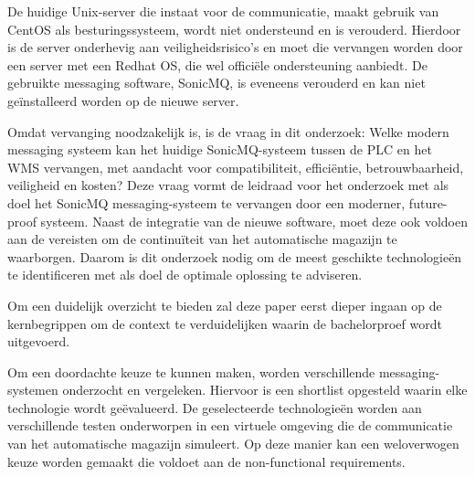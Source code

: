 De huidige Unix-server die instaat voor de communicatie, maakt gebruik van \mbox{CentOS} als besturingssysteem,
wordt niet ondersteund en is verouderd.
Hierdoor is de server onderhevig aan veiligheidsrisico's en moet die vervangen worden door een server met een Redhat OS, 
die wel officiële ondersteuning aanbiedt.
De gebruikte messaging software, SonicMQ, is eveneens verouderd en kan niet geïnstalleerd worden op de nieuwe server. 
\newline

Omdat vervanging noodzakelijk is, is de vraag in dit onderzoek: 
Welke modern messaging systeem kan het huidige SonicMQ-systeem tussen de PLC en het WMS vervangen, 
met aandacht voor compatibiliteit, efficiëntie, betrouwbaarheid, veiligheid en kosten?
Deze vraag vormt de leidraad voor het onderzoek met als doel 
het SonicMQ messaging-systeem te vervangen door een moderner, future-proof systeem.
Naast de integratie van de nieuwe software, moet deze ook voldoen aan de vereisten
om de continuïteit van het automatische magazijn te waarborgen. 
Daarom is dit onderzoek nodig om de meest geschikte technologieën te identificeren met als doel de optimale oplossing te adviseren.
\newline

Om een duidelijk overzicht te bieden zal deze paper eerst dieper ingaan op de kernbegrippen 
om de context te verduidelijken waarin de bachelorproef wordt uitgevoerd.
\newline

Om een doordachte keuze te kunnen maken, worden verschillende messaging-systemen onderzocht en vergeleken.
Hiervoor is een shortlist opgesteld waarin elke technologie wordt geëvalueerd.
De geselecteerde technologieën worden aan verschillende testen onderworpen in een virtuele omgeving die de communicatie van het automatische magazijn simuleert. 
Op deze manier kan een weloverwogen keuze worden gemaakt die voldoet aan de non-functional requirements.